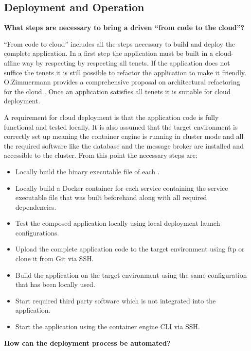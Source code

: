 \subsection{Deployment and Operation}

\noindent
\textbf{What steps are necessary to bring a \ms{} driven \og{} ``from code to
the cloud''?}

``From code to cloud'' includes all the steps necessary to build and deploy the
complete \ms{} \og{} application. In a first step the application must be built
in a cloud-affine way by respecting by respecting all \ms{} tenets. If the
application does not suffice the tenets it is still possible to refactor the
application to make it \ms{} friendly. O.Zimmermann provides a comprehensive
proposal on architectural refactoring for the cloud
\cite{zimmermann2017architectural}. Once an application satisfies all tenets it
is suitable for cloud deployment.

A requirement for cloud deployment is that the application code is fully
functional and tested locally. It is also assumed that the target environment is
correctly set up meaning the container engine is running in cluster mode and all
the required software like the database and the message broker are installed and
accessible to the cluster. From this point the necessary steps are:

\begin{itemize}
  \item Locally build the binary executable file of each \ms{}.
  \item Locally build a Docker container for each service containing the service
  executable file that was built beforehand along with all required dependencies.
  \item Test the composed application locally using local deployment launch
  configurations.
  \item Upload the complete application code to the target environment using ftp
  or clone it from Git via SSH.
  \item Build the application on the target environment using the same
  configuration that has been locally used.
  \item Start required third party software which is not integrated into the
  application.
  \item Start the application using the container engine CLI via SSH.
\end{itemize}

\noindent
\textbf{How can the deployment process be automated?}

